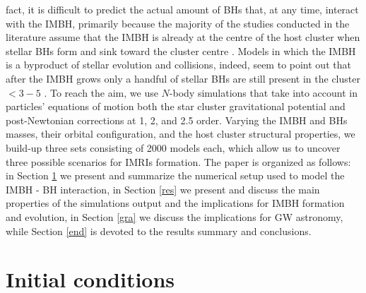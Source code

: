 \documentclass[article]{aa}
\begin{document}
fact, it is difficult to predict the actual amount of BHs that, at any time, interact with the IMBH, primarily because the majority of the studies conducted in the literature assume that the IMBH is already at the centre of the host cluster when stellar BHs form and sink toward the cluster centre \citep{leigh14,haster16}. Models in which the IMBH is a byproduct of stellar evolution and collisions, indeed, seem to point out that after the IMBH grows only a handful of stellar BHs are still present in the cluster $<3-5$ \citep{AAG19}. To reach the aim, we use $N$-body simulations that take into account in particles' equations of motion both the star cluster gravitational potential and post-Newtonian corrections at 1, 2, and 2.5 order. Varying the IMBH and BHs masses, their orbital configuration, and the host cluster structural properties, we build-up three sets consisting of 2000 models each, which allow us to uncover three possible scenarios for IMRIs formation.  
The paper is organized as follows: in Section \ref{num} we
present and summarize the numerical setup used to model the IMBH - BH
interaction, in Section \ref{res} we present and discuss the main properties of
the simulations output and the implications for IMBH formation and evolution, in Section \ref{gra} we discuss the implications for GW astronomy, while Section \ref{end} is devoted to the results summary and conclusions. 





\section{Initial conditions} 
\label{num}
\end{document}
